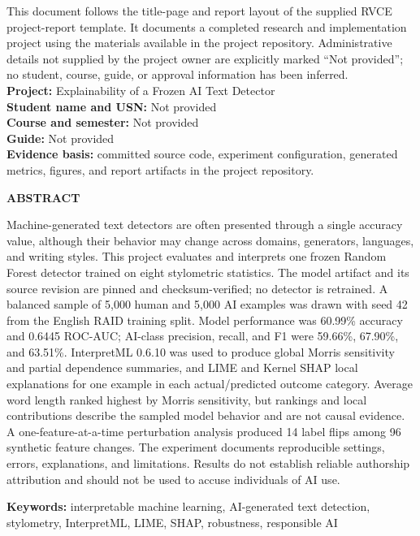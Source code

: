\documentclass[12pt,a4paper]{article}
\newcommand{\ProjectTitle}{Explainability of a Frozen AI Text Detector}
\begin{document}
This document follows the title-page and report layout of the supplied RVCE project-report template. It documents a completed research and implementation project using the materials available in the project repository. Administrative details not supplied by the project owner are explicitly marked ``Not provided''; no student, course, guide, or approval information has been inferred.\\[0.6cm]
\textbf{Project:} \ProjectTitle\\
\textbf{Student name and USN:} Not provided\\
\textbf{Course and semester:} Not provided\\
\textbf{Guide:} Not provided\\
\textbf{Evidence basis:} committed source code, experiment configuration, generated metrics, figures, and report artifacts in the project repository.
\restoregeometry\newpage
\thispagestyle{plain}\begin{center}{\bfseries\fontsize{16}{20}\selectfont ABSTRACT}\end{center}
Machine-generated text detectors are often presented through a single accuracy value, although their behavior may change across domains, generators, languages, and writing styles. This project evaluates and interprets one frozen Random Forest detector trained on eight stylometric statistics. The model artifact and its source revision are pinned and checksum-verified; no detector is retrained. A balanced sample of 5,000 human and 5,000 AI examples was drawn with seed 42 from the English RAID training split. Model performance was 60.99\% accuracy and 0.6445 ROC-AUC; AI-class precision, recall, and F1 were 59.66\%, 67.90\%, and 63.51\%. InterpretML 0.6.10 was used to produce global Morris sensitivity and partial dependence summaries, and LIME and Kernel SHAP local explanations for one example in each actual/predicted outcome category. Average word length ranked highest by Morris sensitivity, but rankings and local contributions describe the sampled model behavior and are not causal evidence. A one-feature-at-a-time perturbation analysis produced 14 label flips among 96 synthetic feature changes. The experiment documents reproducible settings, errors, explanations, and limitations. Results do not establish reliable authorship attribution and should not be used to accuse individuals of AI use.

\textbf{Keywords:} interpretable machine learning, AI-generated text detection, stylometry, InterpretML, LIME, SHAP, robustness, responsible AI
\newpage\tableofcontents\newpage\listoffigures\newpage\listoftables\newpage
\end{document}
